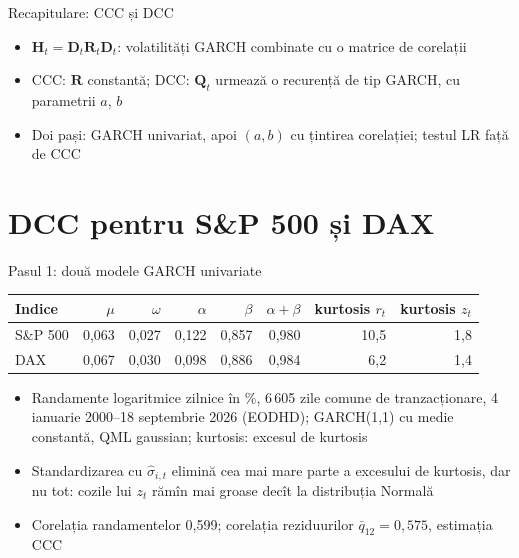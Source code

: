 \begin{frame}{Recapitulare: CCC și DCC}
\itemsize{\small}
\begin{itemize}
    \item $\mathbf{H}_t = \mathbf{D}_t\mathbf{R}_t\mathbf{D}_t$: volatilități GARCH combinate cu o matrice de corelații
    \item CCC: $\mathbf{R}$ constantă; DCC: $\mathbf{Q}_t$ urmează o recurență de tip GARCH, cu parametrii $a$, $b$
    \item Doi pași: GARCH univariat, apoi $(a, b)$ cu țintirea corelației; testul LR față de CCC
\end{itemize}
\end{frame}


\section{DCC pentru S\&P 500 și DAX}

\begin{frame}{Pasul 1: două modele GARCH univariate}
\itemsize{\footnotesize}
\begin{center}
\small
\begin{tabular}{lrrrrrrr}
\toprule
\textbf{Indice} & $\mu$ & $\omega$ & $\alpha$ & $\beta$ & $\alpha + \beta$ & kurtosis $r_t$ & kurtosis $z_t$ \\
\midrule
S\&P 500 & 0{,}063 & 0{,}027 & 0{,}122 & 0{,}857 & 0{,}980 & 10{,}5 & 1{,}8 \\
DAX & 0{,}067 & 0{,}030 & 0{,}098 & 0{,}886 & 0{,}984 & 6{,}2 & 1{,}4 \\
\bottomrule
\end{tabular}
\end{center}
\begin{itemize}
    \item Randamente logaritmice zilnice în \%, 6\,605 zile comune de tranzacționare, 4 ianuarie 2000--18 septembrie 2026 (EODHD); GARCH(1,1) cu medie constantă, QML gaussian; kurtosis: excesul de kurtosis
    \item Standardizarea cu $\hat\sigma_{i,t}$ elimină cea mai mare parte a excesului de kurtosis, dar nu tot: cozile lui $z_t$ rămîn mai groase decît la distribuția Normală
    \item Corelația randamentelor 0{,}599; corelația reziduurilor $\bar q_{12} = 0{,}575$, estimația CCC
\end{itemize}
\end{frame}


